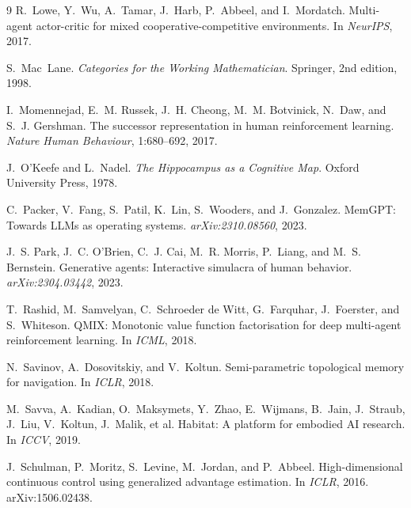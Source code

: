 \documentclass{article}
\begin{document}
{\begin{thebibliography}{9}
R.~Lowe, Y.~Wu, A.~Tamar, J.~Harb, P.~Abbeel, and I.~Mordatch.
\newblock Multi-agent actor-critic for mixed cooperative-competitive environments.
\newblock In \emph{NeurIPS}, 2017.

S.~Mac~Lane.
\newblock \emph{Categories for the Working Mathematician}.
\newblock Springer, 2nd edition, 1998.

I.~Momennejad, E.~M. Russek, J.~H. Cheong, M.~M. Botvinick, N.~Daw, and S.~J. Gershman.
\newblock The successor representation in human reinforcement learning.
\newblock \emph{Nature Human Behaviour}, 1:680--692, 2017.

J.~O'Keefe and L.~Nadel.
\newblock \emph{The Hippocampus as a Cognitive Map}.
\newblock Oxford University Press, 1978.

C.~Packer, V.~Fang, S.~Patil, K.~Lin, S.~Wooders, and J.~Gonzalez.
\newblock MemGPT: Towards LLMs as operating systems.
\newblock \emph{arXiv:2310.08560}, 2023.

J.~S. Park, J.~C. O'Brien, C.~J. Cai, M.~R. Morris, P.~Liang, and M.~S. Bernstein.
\newblock Generative agents: Interactive simulacra of human behavior.
\newblock \emph{arXiv:2304.03442}, 2023.

T.~Rashid, M.~Samvelyan, C.~Schroeder de Witt, G.~Farquhar, J.~Foerster, and S.~Whiteson.
\newblock QMIX: Monotonic value function factorisation for deep multi-agent reinforcement learning.
\newblock In \emph{ICML}, 2018.

N.~Savinov, A.~Dosovitskiy, and V.~Koltun.
\newblock Semi-parametric topological memory for navigation.
\newblock In \emph{ICLR}, 2018.

M.~Savva, A.~Kadian, O.~Maksymets, Y.~Zhao, E.~Wijmans, B.~Jain, J.~Straub, J.~Liu, V.~Koltun, J.~Malik, et al.
\newblock Habitat: A platform for embodied AI research.
\newblock In \emph{ICCV}, 2019.

J.~Schulman, P.~Moritz, S.~Levine, M.~Jordan, and P.~Abbeel.
\newblock High-dimensional continuous control using generalized advantage estimation.
\newblock In \emph{ICLR}, 2016.
\newblock arXiv:1506.02438.


\end{thebibliography}}
\end{document}
